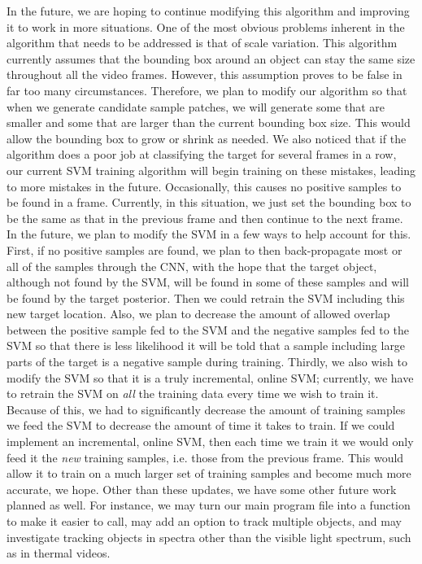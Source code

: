 \documentclass{sig-alternate-05-2015}
\begin{document}
In the future, we are hoping to continue modifying this algorithm and improving it to work in more situations.
One of the most obvious problems inherent in the algorithm that needs to be addressed is that of scale variation.
This algorithm currently assumes that the bounding box around an object can stay the same size throughout all the video frames.
However, this assumption proves to be false in far too many circumstances.
Therefore, we plan to modify our algorithm so that when we generate candidate sample patches, we will generate some that are smaller and some that are larger than the current bounding box size.
This would allow the bounding box to grow or shrink as needed.
We also noticed that if the algorithm does a poor job at classifying the target for several frames in a row, our current SVM training algorithm will begin training on these mistakes, leading to more mistakes in the future.
Occasionally, this causes no positive samples to be found in a frame. Currently, in this situation, we just set the bounding box to be the same as that in the previous frame and then continue to the next frame.
In the future, we plan to modify the SVM in a few ways to help account for this.
First, if no positive samples are found, we plan to then back-propagate most or all of the samples through the CNN, with the hope that the target object, although not found by the SVM, will be found in some of these samples and will be found by the target posterior.
Then we could retrain the SVM including this new target location.
Also, we plan to decrease the amount of allowed overlap between the positive sample fed to the SVM and the negative samples fed to the SVM so that there is less likelihood it will be told that a sample including large parts of the target is a negative sample during training.
Thirdly, we also wish to modify the SVM so that it is a truly incremental, online SVM; currently, we have to retrain the SVM on \textit{all} the training data every time we wish to train it.
Because of this, we had to significantly decrease the amount of training samples we feed the SVM to decrease the amount of time it takes to train.
If we could implement an incremental, online SVM, then each time we train it we would only feed it the \textit{new} training samples, i.e. those from the previous frame.
This would allow it to train on a much larger set of training samples and become much more accurate, we hope.
Other than these updates, we have some other future work planned as well.
For instance, we may turn our main program file into a function to make it easier to call, may add an option to track multiple objects, and may investigate tracking objects in spectra other than the visible light spectrum, such as in thermal videos.
\end{document}
